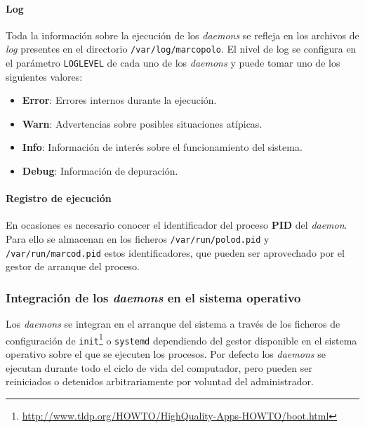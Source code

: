 
\paragraph{Log\\}
Toda la información sobre la ejecución de los \textit{daemons} se refleja en los archivos de \textit{log} presentes en el directorio \texttt{/var/log/marcopolo}. El nivel de log se configura en el parámetro \texttt{LOGLEVEL} de cada uno de los \textit{daemons} y puede tomar uno de los siguientes valores:

\begin{itemize}
	\item \textbf{Error}: Errores internos durante la ejecución.
	\item \textbf{Warn}: Advertencias sobre posibles situaciones atípicas.
	\item \textbf{Info}: Información de interés sobre el funcionamiento del sistema.
	\item \textbf{Debug}: Información de depuración.
\end{itemize}

\paragraph{Registro de ejecución\\}

En ocasiones es necesario conocer el identificador del proceso \textbf{PID} del \textit{daemon}. Para ello se almacenan en los ficheros \texttt{/var/run/polod.pid} y \texttt{/var/run/marcod.pid} estos identificadores, que pueden ser aprovechado por el gestor de arranque del proceso.

\subsubsection{Integración de los \textit{daemons} en el sistema operativo}

Los \textit{daemons} se integran en el arranque del sistema a través de los ficheros de configuración de \texttt{init}\footnote{\href{http://www.tldp.org/HOWTO/HighQuality-Apps-HOWTO/boot.html}{http://www.tldp.org/HOWTO/HighQuality-Apps-HOWTO/boot.html}} o \texttt{systemd} dependiendo del gestor disponible en el sistema operativo sobre el que se ejecuten los procesos. Por defecto los \textit{daemons} se ejecutan durante todo el ciclo de vida del computador, pero pueden ser reiniciados o detenidos arbitrariamente por voluntad del administrador.

